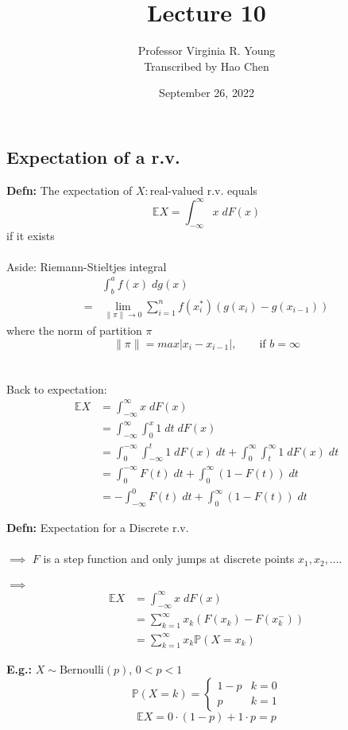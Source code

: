 \documentclass[a4paper]{article}
\title{Lecture 10}
\author{Professor Virginia R. Young\\ \small{Transcribed by Hao Chen}}
\date{September 26, 2022}
\newcommand{\n}{\hfill\break}
\newcommand{\defn}[1]{\par\noindent\settowidth{\hangindent}{\textbf{Defn: }}\textbf{Defn: }#1\n}
\newcommand{\eg}[1]{\par\noindent\settowidth{\hangindent}{\textbf{E.g.: }}\textbf{E.g.: }#1\n}
\newcommand{\Prob}{\mathbb{P}}
\renewcommand{\P}{\Prob}
\newcommand{\Avg}{\mathbb{E}}
\newcommand{\E}{\Avg}
\begin{document}
\maketitle

\subsection*{Expectation of a r.v.}

\defn{The expectation of $X:\text{real-valued r.v.}$ equals
\[\E X=\int^\infty_{-\infty} x\;dF(x)\]
if it exists
\\\\
Aside: Riemann-Stieltjes integral
\begin{align*}
    &\int^a_b f(x)\;dg(x) \\
    =&\lim_{\|\pi\|\rightarrow0}\sum^n_{i=1}f(x_i^*)(g(x_i)-g(x_{i-1}))
\end{align*}
where the norm of partition $\pi$ 
\[\|\pi\|=max|x_i-x_{i-1}|, \qquad\text{if }b=\infty\]
\\\\
Back to expectation:
\begin{align*}
    \E X&=\int^\infty_{-\infty} x\;dF(x) \\
    &=\int^\infty_{-\infty}\int^x_0 1\;dt\;dF(x) \\
    &=\int^{-\infty}_0\int^t_{-\infty} 1\;dF(x)\;dt + \int^\infty_{0}\int^\infty_t 1\;dF(x)\;dt \\
    &=\int^{-\infty}_0 F(t)\;dt+\int^\infty_0 (1-F(t))\;dt \\
    &=-\int_{-\infty}^0 F(t)\;dt+\int^\infty_0 (1-F(t))\;dt
\end{align*}
}

\defn{Expectation for a Discrete r.v.
\\\\
$\implies$ $F$ is a step function and only jumps at discrete points $x_1, x_2, \dots$. 
\\\\
$\implies$
\begin{align*}
    \E X&=\int^\infty_{-\infty} x\;dF(x) \\
    &=\sum^\infty_{k=1}x_k(F(x_k)-F(x_k^-)) \\
    &=\sum^\infty_{k=1}x_k\P(X=x_k)
\end{align*}
}

\eg{$X\sim\text{Bernoulli}(p)$, $0<p<1$
\[\P(X=k)=\left\{\begin{array}{lc}1-p&k=0\\p&k=1\end{array}\right.\]
\[\E X=0\cdot(1-p)+1\cdot p=p\]
}
\end{document}
